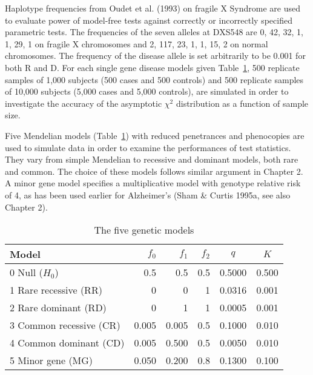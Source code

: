 Haplotype frequencies from Oudet et al.  (1993) on fragile X Syndrome are used
to evaluate power of model-free tests against correctly or incorrectly
specified parametric tests.  The frequencies of the seven alleles at DXS548 are
0, 42, 32, 1, 1, 29, 1 on fragile X chromosomes and 2, 117, 23, 1, 1, 15, 2 on
normal chromosomes.  The frequency of the disease allele is set arbitrarily to
be 0.001 for both R and D.  For each single gene disease models given
Table~\ref{model}, 500 replicate samples of 1,000 subjects (500 cases and 500
controls) and 500 replicate samples of 10,000 subjects (5,000 cases and 5,000
controls), are simulated in order to investigate the accuracy of the asymptotic
$\chi^2$ distribution as a function of sample size.

Five Mendelian models (Table~\ref{model}) with reduced penetrances and
phenocopies are used to simulate data in order to examine the performances of
test statistics.  They vary from simple Mendelian to recessive and dominant
models, both rare and common.  The choice of these models follows similar
argument in Chapter 2.  A minor gene model specifies a multiplicative model
with genotype relative risk of 4, as has been used earlier for Alzheimer's
(Sham \& Curtis 1995a, see also Chapter 2).

\begin{table}[h]\centering
\caption{The five genetic models\label{model}}
\begin{tabular}{lrrrcc}
\\
\hline
 Model                 & $f_0$ & $f_1$ & $f_2$ &  $q$     &   $K$\\
\hline
0 Null ($H_0$)         &   0.5 &  0.5  & 0.5   &0.5000    &0.500\\
1 Rare recessive (RR)  &     0 &    0  &   1   &0.0316    &0.001\\
2 Rare dominant (RD)   &     0 &    1  &   1   &0.0005    &0.001\\
3 Common recessive (CR)& 0.005 &0.005  & 0.5   &0.1000    &0.010\\
4 Common dominant (CD) & 0.005 &0.500  & 0.5   &0.0050    &0.010\\
5 Minor gene (MG)      & 0.050 &0.200  & 0.8   &0.1300    &0.100\\
\hline
\end{tabular}
\end{table}

